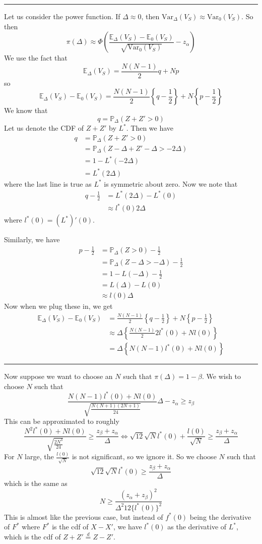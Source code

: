 \documentclass[a4paper,12pt]{amsart}
\newcommand{\Var}{\mbox{Var}}
\newcommand{\sP}{\mathbb{P}}
\begin{document}
\hrule \bigskip
Let us consider the power function. If $\Delta \approx 0$, then $\Var_\Delta(V_S) \approx \Var_0(V_S)$. So then
\[\pi(\Delta) \approx \Phi\left(\frac{\mathbb{E}_\Delta(V_S) - \mathbb{E}_0(V_S)}{\sqrt{\Var_0(V_S)}} - z_\alpha\right)\]
We use the fact that
\[\mathbb{E}_\Delta(V_S) = \frac{N(N-1)}{2}q + Np\]
so
\[\mathbb{E}_\Delta(V_S) - \mathbb{E}_0(V_S) = \frac{N(N-1)}{2}\left\{q- \frac{1}{2}\right\} + N \left\{p - \frac{1}{2}\right\}\]
We know that 
\[q = \sP_\Delta(Z + Z'>0)\]
Let us denote the CDF of $Z + Z'$ by $L^*$. Then we have
\begin{align*}
q &= \sP_\Delta(Z+ Z' > 0)\\
&= \sP_\Delta(Z - \Delta + Z' - \Delta > - 2\Delta)\\
&= 1 - L^*(-2\Delta)\\
&= L^*(2 \Delta)
\end{align*}
where the last line is true as $L^*$ is symmetric about zero. Now we note that
\begin{align*}
q - \frac{1}{2} &= L^*(2 \Delta) - L^*(0) \\
&\approx l^*(0) 2 \Delta
\end{align*}
where $l^*(0) = (L^*)'(0)$.

Similarly, we have
\begin{align*}
p - \frac{1}{2} &= \sP_\Delta(Z >0) - \frac{1}{2}\\
&= \sP_\Delta(Z - \Delta > - \Delta) - \frac{1}{2}\\
&= 1 - L(-\Delta) - \frac{1}{2}\\
&= L(\Delta) - L(0)\\
&\approx l(0) \Delta
\end{align*}
Now when we plug these in, we get
\begin{align*}
\mathbb{E}_\Delta(V_S) - \mathbb{E}_0(V_S) &= \frac{N(N-1)}{2}\left\{q- \frac{1}{2}\right\} + N \left\{p - \frac{1}{2}\right\}\\
& \approx \Delta \left\{\frac{N(N-1)}{2}2l^*(0) + Nl(0)\right\}\\
&= \Delta \left\{N(N-1)l^*(0) + Nl(0)\right\}
\end{align*}
\hrule \bigskip
Now suppose we want to choose an $N$ such that $\pi(\Delta) = 1- \beta$.
We wish to choose $N$ such that
\[\frac{N(N-1)l^*(0) + Nl(0)}{\sqrt{\displaystyle \frac{N(N+1)(2N+1)}{24}}}\Delta - z_\alpha \geq z_\beta\]
This can be approximated to roughly
\[\frac{N^2 l^*(0) + N l(0)}{\sqrt{\frac{2N^3}{24}}} \geq \frac{z_\beta + z_\alpha}{\Delta} \Leftrightarrow \sqrt{12}\sqrt{N}l^*(0) + \frac{l(0)}{\sqrt{N}} \geq \frac{z_\beta + z_\alpha}{\Delta}\]
For $N$ large, the $\frac{l(0)}{\sqrt{N}}$ is not significant, so we ignore it.
So we choose $N$ such that
\[\sqrt{12}\sqrt{N}l^*(0) \geq \frac{z_\beta + z_\alpha}{\Delta}\]
which is the same as
\[N \geq \frac{(z_\alpha + z_\beta)^2}{\Delta^2 12 \{l^*(0)\}^2}\]
This is almost like the previous case, but instead of $f^*(0)$ being the derivative of $F^*$ where $F^*$ is the cdf of $X - X'$, we have $l^*(0)$ as the derivative of $L^*$, which is the cdf of $Z + Z' \overset{d}{=} Z - Z'$.
\end{document}
